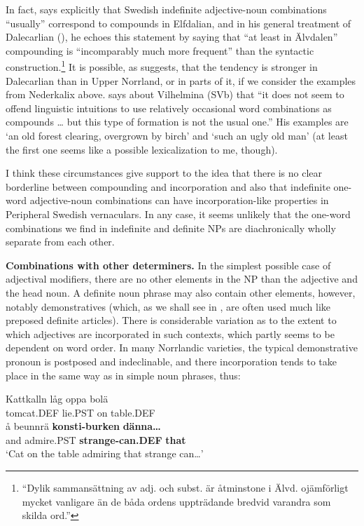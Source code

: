 In fact, \citet[51]{Levander1909} says explicitly that Swedish indefinite adjective-noun combinations “usually” correspond to compounds in Elfdalian, and in his general treatment of Dalecarlian (\citet[142]{Levander1928}), he echoes this statement by saying that “at least in Älvdalen” compounding is “incomparably much more frequent” than the syntactic construction.\footnote{ “Dylik sammansättning av adj. och subst. är åtminstone i Älvd. ojämförligt mycket vanligare än de båda ordens uppträdande bredvid varandra som skilda ord.”} It is possible, as \citet[44, Fn 19]{Delsing2003a} suggests, that the tendency is stronger in Dalecarlian than in Upper Norrland, or in parts of it, if we consider the examples from Nederkalix above. \citet[98]{Dahlstedt1962} says about Vilhelmina (SVb) that “it does not seem to offend linguistic intuitions to use relatively occasional word combinations as compounds … but this type of formation is not the usual one.” His examples are  ‘an old forest clearing, overgrown by birch’ and ‘such an ugly old man’ (at least the first one seems like a possible lexicalization to me, though). 

I think these circumstances give support to the idea that there is no clear borderline between compounding and incorporation and also that indefinite one-word adjective-noun combinations can have incorporation-like properties in Peripheral Swedish vernaculars. In any case, it seems unlikely that the one-word combinations we find in indefinite and definite NPs are diachronically wholly separate from each other.

\textbf{Combinations with other determiners. }In the simplest possible case of adjectival modifiers, there are no other elements in the NP than the adjective and the head noun. A definite noun phrase may also contain other elements, however, notably demonstratives (which, as we shall see in , are often used much like preposed definite articles). There is considerable variation as to the extent to which adjectives are incorporated in such contexts, which partly seems to be dependent on word order. In many Norrlandic varieties, the typical demonstrative pronoun is postposed and indeclinable, and there incorporation tends to take place in the same way as in simple noun phrases, thus:

\ea\label{}
\gll Kattkalln  låg  oppa  bolä\\
tomcat.DEF  lie.PST  on  table.DEF\\
\gll å  beunnrä  \textbf{konsti-burken}\textbf{  dänna…}\\
and  admire.PST  \textbf{strange-can.DEF} \textbf{that}\\
\glt ‘Cat on the table admiring that strange can…’
\z

